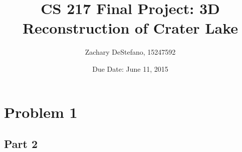 \documentclass[11pt,psfig]{article}
\begin{document}
\setlength{\parskip}{1.2ex plus0.3ex minus 0.3ex}


\thispagestyle{empty} \pagestyle{myheadings} 

\title{CS 217 Final Project: 3D Reconstruction of Crater Lake}
\author{Zachary DeStefano, 15247592}
\date{Due Date: June 11, 2015}

\maketitle

\vfill\eject

\newpage

\section{Problem 1}


\newpage

\subsection{Part 2}


\end{document}
